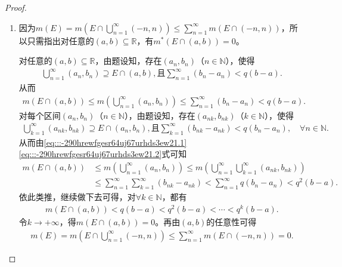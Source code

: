 \documentclass[../../main.tex]{subfiles}%
\begin{document}
\begin{proof}
\begin{enumerate}[(1)]
\item 因为$m(E)=m\left(E\cap\bigcup\limits_{n=1}^{\infty}(-n,n)\right)\leqslant\sum\limits_{n=1}^{\infty}m(E\cap(-n,n))$，所以只需指出对任意的$(a,b)\subseteq\mathbb{R}$，有$m^*(E\cap(a,b))=0$。

对任意的$(a,b)\subseteq\mathbb{R}$，由题设知，存在$(a_n,b_n)$（$n\in\mathbb{N}$），使得
\begin{align}
\bigcup\limits_{n=1}^{\infty}(a_n,b_n)\supseteq E\cap(a,b),\text{且}\sum\limits_{n=1}^{\infty}(b_n-a_n)<q(b-a).\label{eq:::-290hrewfgesr64uj67urhds3ew21.1}
\end{align}
从而
\begin{align*}
m(E\cap(a,b))\leqslant m\left(\bigcup\limits_{n=1}^{\infty}(a_n,b_n)\right)\leqslant\sum\limits_{n=1}^{\infty}(b_n-a_n)<q(b-a).
\end{align*}
对每个区间$(a_n,b_n)$（$n\in\mathbb{N}$），由题设知，存在$(a_{nk},b_{nk})$（$k\in\mathbb{N}$），使得
\begin{align}
\bigcup\limits_{k=1}^{\infty}(a_{nk},b_{nk})\supseteq E\cap(a_n,b_n),\text{且}\sum\limits_{k=1}^{\infty}(b_{nk}-a_{nk})<q(b_n-a_n),\quad \forall n\in\mathbb{N}.\label{eq:::-290hrewfgesr64uj67urhds3ew21.2}
\end{align}
从而由\eqref{eq:::-290hrewfgesr64uj67urhds3ew21.1}\eqref{eq:::-290hrewfgesr64uj67urhds3ew21.2}式可知
\begin{align*}
m(E\cap(a,b))&\leqslant m\left(\bigcup\limits_{n=1}^{\infty}(a_n,b_n)\right)\leqslant m\left(\bigcup\limits_{n=1}^{\infty}\bigcup\limits_{k=1}^{\infty}(a_{nk},b_{nk})\right)\\
&\leqslant\sum\limits_{n=1}^{\infty}\sum\limits_{k=1}^{\infty}(b_{nk}-a_{nk})<\sum\limits_{n=1}^{\infty}q(b_n-a_n)<q^2(b-a).
\end{align*}
依此类推，继续做下去可得，对$\forall k\in\mathbb{N}$，都有
\begin{align*}
m(E\cap(a,b))<q(b-a)<q^2(b-a)<\cdots<q^k(b-a).
\end{align*}
令$k\rightarrow+\infty$，得$m(E\cap(a,b))=0$。再由$(a,b)$的任意性可得
\begin{align*}
m(E)=m\left(E\cap\bigcup\limits_{n=1}^{\infty}(-n,n)\right)\leqslant\sum\limits_{n=1}^{\infty}m(E\cap(-n,n))=0.
\end{align*}


\end{enumerate}
\end{proof}
\end{document}
